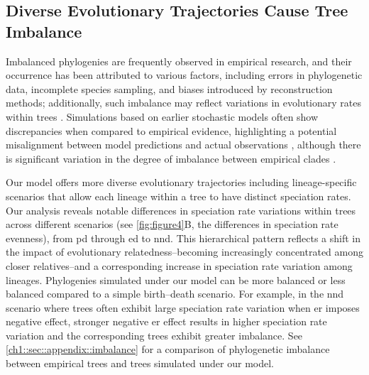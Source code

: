 {\subsection{Diverse Evolutionary Trajectories Cause Tree Imbalance}
\label{ch1::sec::discussion::imbalance}
Imbalanced phylogenies are frequently observed in empirical research, and their occurrence has been attributed to various factors, including errors in phylogenetic data, incomplete species sampling, and biases introduced by reconstruction methods; additionally, such imbalance may reflect variations in evolutionary rates within trees \citep{stam_does_2002, blum_which_2006}. Simulations based on earlier stochastic models often show discrepancies when compared to empirical evidence, highlighting a potential misalignment between model predictions and actual observations \citep{blum_which_2006}, although there is significant variation in the degree of imbalance between empirical clades \citep{janzen_phylogenetic_2024}.

Our model offers more diverse evolutionary trajectories including lineage-specific scenarios that allow each lineage within a tree to have distinct speciation rates. Our analysis reveals notable differences in speciation rate variations within trees across different scenarios (see \autoref{fig:figure4}B, the differences in speciation rate evenness), from \acrshort{pd} through \acrshort{ed} to \acrshort{nnd}. This hierarchical pattern reflects a shift in the impact of evolutionary relatedness--becoming increasingly concentrated among closer relatives--and a corresponding increase in speciation rate variation among lineages. Phylogenies simulated under our model can be more balanced or less balanced compared to a simple birth--death scenario. For example, in the \acrshort{nnd} scenario where trees often exhibit large speciation rate variation when \acrshort{er} imposes negative effect, stronger negative \acrshort{er} effect results in higher speciation rate variation and the corresponding trees exhibit greater imbalance. See \autoref{ch1::sec::appendix::imbalance} for a comparison of phylogenetic imbalance between empirical trees and trees simulated under our model.

}
